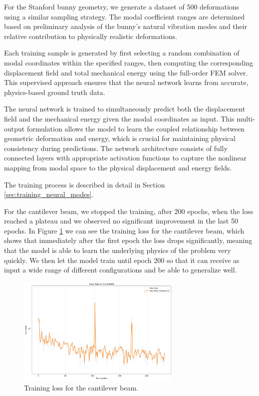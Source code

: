 For the Stanford bunny geometry, we generate a dataset of 500 deformations using a similar sampling strategy. The modal coefficient ranges are determined based on preliminary analysis of the bunny's natural vibration modes and their relative contribution to physically realistic deformations.

Each training sample is generated by first selecting a random combination of modal coordinates within the specified ranges, then computing the corresponding displacement field and total mechanical energy using the full-order FEM solver. This supervised approach ensures that the neural network learns from accurate, physics-based ground truth data.

The neural network is trained to simultaneously predict both the displacement field and the mechanical energy given the modal coordinates as input. This multi-output formulation allows the model to learn the coupled relationship between geometric deformation and energy, which is crucial for maintaining physical consistency during predictions. The network architecture consists of fully connected layers with appropriate activation functions to capture the nonlinear mapping from modal space to the physical displacement and energy fields.

The training process is described in detail in Section \ref{sec:training_neural_modes}.

For the cantilever beam, we stopped the training, after 200 epochs, when the loss reached a plateau and we observed no significant improvement in the last 50 epochs. In Figure \ref{fig:training_loss_beam} we can see the training loss for the cantilever beam, which shows that immediately after the first epoch the loss drops significantly, meaning that the model is able to learn the underlying physics of the problem very quickly. We then let the model train until epoch 200 so that it can receive as input a wide range of different configurations and be able to generalize well.

\begin{figure}[H]
    \centering
    \includegraphics[width=0.7\textwidth]{Images/training_loss_smoothed_logy.png}
    \caption{Training loss for the cantilever beam.}
    \label{fig:training_loss_beam}
\end{figure}

